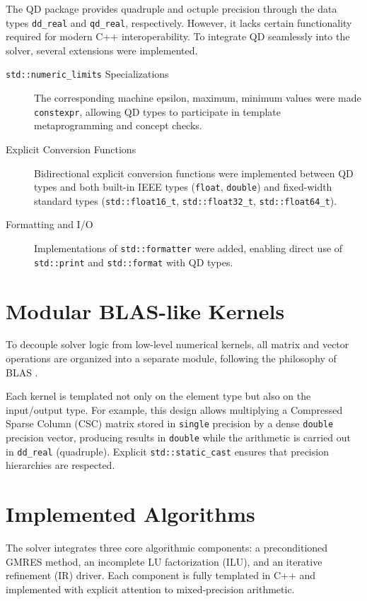 The QD package provides quadruple and octuple precision through the data types
\texttt{dd\_real} and \texttt{qd\_real}, respectively. However, it lacks certain
functionality required for modern C++ interoperability. To integrate QD
seamlessly into the solver, several extensions were implemented.

\begin{description}
\item[\texttt{std::numeric\_limits} Specializations] The corresponding machine epsilon,
  maximum, minimum values were made \texttt{constexpr}, allowing QD types to
  participate in template metaprogramming and concept checks.
\item[Explicit Conversion Functions] Bidirectional explicit conversion functions
  were implemented between QD types and both built-in IEEE types
  (\texttt{float}, \texttt{double}) and fixed-width standard types
  (\texttt{std::float16\_t}, \texttt{std::float32\_t},
  \texttt{std::float64\_t}).
\item [Formatting and I/O] Implementations of \texttt{std::formatter} were added,
  enabling direct use of \texttt{std::print} and \texttt{std::format} with QD
  types.
\end{description}

\section{Modular BLAS-like Kernels}
\label{sec:modular-blas-like}

To decouple solver logic from low-level numerical kernels, all matrix and vector
operations are organized into a separate module, following the philosophy of
BLAS \cite{blackford_2002_updated}.

Each kernel is templated not only on the element type but also on the
input/output type. For example, this design allows multiplying a Compressed
Sparse Column (CSC) matrix stored in \texttt{single} precision by a dense
\texttt{double} precision vector, producing results in \texttt{double} while the
arithmetic is carried out in \texttt{dd\_real} (quadruple). Explicit
\texttt{std::static\_cast} ensures that precision hierarchies are respected.

\section{Implemented Algorithms}
\label{sec:impl-algo}

The solver integrates three core algorithmic components: a preconditioned GMRES
method, an incomplete LU factorization (ILU), and an iterative refinement (IR)
driver. Each component is fully templated in C++ and implemented with explicit
attention to mixed-precision arithmetic.

